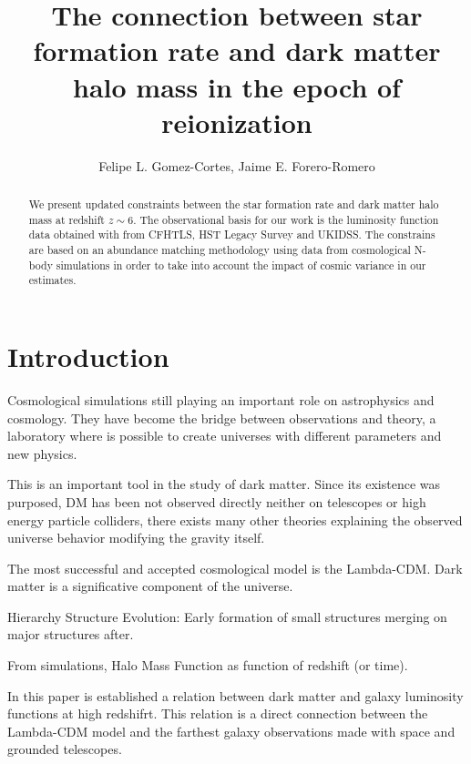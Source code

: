 \documentclass{emulateapj}
\begin{document}
\title{The connection between star formation rate and dark matter halo
  mass in the epoch of reionization}  


\author{Felipe L. Gomez-Cortes, Jaime E. Forero-Romero}  

\begin{abstract}
We present updated constraints between the star formation rate and
dark matter halo mass at redshift $z\sim 6$.
The observational basis for our work is the luminosity function data
obtained with from CFHTLS, HST Legacy Survey and UKIDSS.
The constrains are based on an abundance matching methodology using data
from cosmological N-body simulations in order to take into account the impact
of cosmic variance in our estimates.
\end{abstract}


\section{Introduction}
\label{sec:intro}
Cosmological simulations still playing an important role on astrophysics and
cosmology. They have become the bridge between observations and theory, a
laboratory where is possible to create universes with different parameters and
new physics. 

This is an important tool in the study of dark matter. Since its existence was
purposed, DM has been not observed directly neither on telescopes or high energy
particle colliders, there exists many other theories explaining the observed
universe behavior modifying the gravity itself.

The most successful and accepted cosmological model is the Lambda-CDM. 
Dark matter is a significative component of the universe.
\citep{trimble87}

Hierarchy Structure Evolution: Early formation of small structures
merging on major structures after.

From simulations, Halo Mass Function as function of redshift (or time).


In this paper is established a relation between dark matter and galaxy
luminosity functions at high redshifrt. This relation is a direct
connection between the Lambda-CDM model and the farthest galaxy observations
made with space and grounded telescopes.
\end{document}
